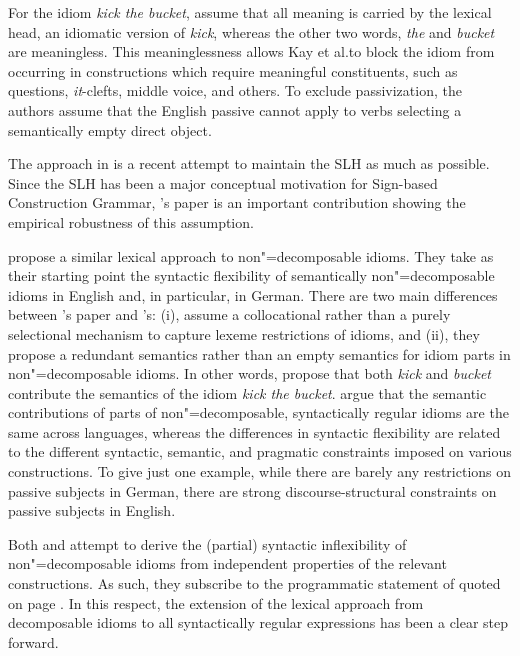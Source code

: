 \documentclass[output=paper
                ,modfonts
                ,nonflat
	        ,collection
	        ,collectionchapter
	        ,collectiontoclongg
 	        ,biblatex
                ,babelshorthands
                ,newtxmath
                ,draftmode
                ,colorlinks, citecolor=brown
]{./langsci/langscibook}
\begin{document}
For the idiom \emph{kick the bucket}, \citet{KSF2015a} assume that all meaning is carried by the lexical head, an idiomatic version of \emph{kick}, whereas the other two words, \emph{the} and \emph{bucket} are meaningless. 
This meaninglessness allows Kay et al.\@ to block the idiom from occurring in constructions which require meaningful constituents, such as questions, \emph{it}-clefts, middle voice, and others. 
To exclude passivization, the authors assume that the English passive cannot apply to verbs selecting a semantically empty direct object.

The approach in \citet{KSF2015a} is a recent attempt to maintain the SLH as much as possible. 
Since the SLH has been a major conceptual motivation for Sign-based Construction Grammar, \citeauthor{KSF2015a}'s paper is an important contribution showing the empirical robustness of this assumption.

\citet{Bargmann:Sailer:18} propose a similar lexical approach to non"=de\-com\-pos\-able idioms. 
They take as their starting point the syntactic flexibility of semantically non"=decomposable idioms in English and, in particular, in German.
There are two main differences between \citeauthor{KSF2015a}'s paper and \citeauthor{Bargmann:Sailer:18}'s: (i), \citeauthor{Bargmann:Sailer:18} assume a collocational rather than a purely selectional mechanism to capture lexeme restrictions of idioms, and (ii), they propose a redundant semantics rather than an empty semantics for idiom parts in non"=decomposable idioms. In other words, \citet{Bargmann:Sailer:18} propose that both \emph{kick} and \emph{bucket} contribute the semantics of the idiom \emph{kick the bucket}. 
\citeauthor{Bargmann:Sailer:18} argue that the semantic contributions of parts of non"=decomposable, syntactically regular idioms are the same across languages, whereas the differences in syntactic flexibility are related to the different syntactic, semantic, and pragmatic constraints imposed on various constructions. 
To give just one example, while there are barely any restrictions on passive subjects in German, there are strong discourse-structural constraints on passive subjects in English.

Both \citet{KSF2015a} and \citet{Bargmann:Sailer:18} attempt to derive the (partial) syntactic inflexibility of non"=decomposable idioms from independent properties of the relevant constructions. 
As such, they subscribe to the programmatic statement of \citet{NSW94a} quoted on page \pageref{NSW-quote}.  
In this respect, the extension of the lexical approach from decomposable idioms to all syntactically regular expressions has been a clear step forward. 
\end{document}
